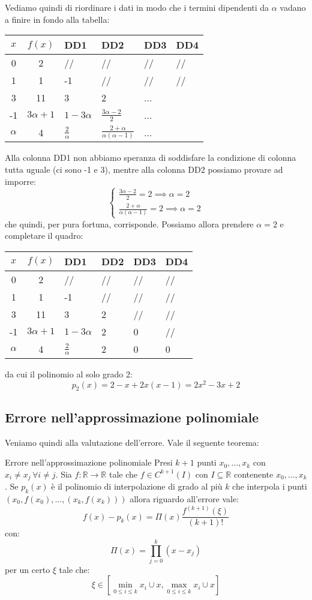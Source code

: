 \documentclass[a4paper,11pt]{article}
\begin{document}
Vediamo quindi di riordinare i dati in modo che i termini dipendenti da $\alpha$ vadano a finire in fondo alla tabella:
\begin{table}[H]
	\center 
	\begin{tabular} { c | c | p{1cm} p{1cm} p{1cm} p{1cm} }
		$x$ & $f(x)$ & DD1 & DD2 & DD3 & DD4\\
		\hline
		0 & 2 & // & // & // & // \\
		1 & 1 & -1 & // & // & // \\
		3 & 11 & 3 & 2 & ...\\
		-1 & $3 \alpha + 1$ & $1 - 3 \alpha$ & $\frac{3 \alpha - 2}{2}$ & ... \\
		$\alpha$ & 4 & $\frac{2}{\alpha}$ & $\frac{2 + \alpha}{\alpha(\alpha - 1)}$ & ...
	\end{tabular}
\end{table}

Alla colonna DD1 non abbiamo speranza di soddisfare la condizione di colonna tutta uguale (ci sono -1 e 3), mentre alla colonna DD2 possiamo provare ad imporre:
\[
	\begin{cases}
		\frac{3 \alpha - 2}{2} = 2 \implies \alpha = 2 \\
		\frac{2 + \alpha}{\alpha(\alpha - 1)} = 2 \implies \alpha = 2
	\end{cases}
\]
che quindi, per pura fortuna, corrisponde.
Possiamo allora prendere $\alpha = 2$ e completare il quadro:
\begin{table}[H]
	\center 
	\begin{tabular} { c | c | p{1cm} p{1cm} p{1cm} p{1cm} }
		$x$ & $f(x)$ & DD1 & DD2 & DD3 & DD4\\
		\hline
		0 & 2 & // & // & // & // \\
		1 & 1 & -1 & // & // & // \\
		3 & 11 & 3 & 2 & // & //\\
		-1 & $3 \alpha + 1$ & $1 - 3 \alpha$ & 2 & 0 & // \\
		$\alpha$ & 4 & $\frac{2}{\alpha}$ & 2 & 0 & 0
	\end{tabular}
\end{table}
da cui il polinomio al solo grado 2:
$$
p_2(x) = 2 - x + 2x(x - 1) = 2x^2 - 3x + 2
$$

\subsection{Errore nell'approssimazione polinomiale}
Veniamo quindi alla valutazione dell'errore.
Vale il seguente teorema:
\begin{theorem}{Errore nell'approssimazione polinomiale}
	Presi $k + 1$ punti $x_0, ..., x_k$ con $x_i \neq x_j \, \forall i \neq j$.
	Sia $f: \mathbb{R} \rightarrow \mathbb{R}$ tale che $f \in C^{k + 1}(I)$ con $I \subseteq \mathbb{R}$ contenente $x_0, ..., x_k$.
	Se $p_k(x)$ è il polinomio di interpolazione di grado al più $k$ che interpola i punti $(x_0, f(x_0), ..., (x_k, f(x_k)))$ allora riguardo all'errore vale:
$$
f(x) - p_k(x) = \Pi(x) \frac{f^{(k + 1)}(\xi)}{(k + 1)!}
$$
con:
$$
\Pi(x) = \prod_{j = 0}^k (x - x_j)
$$
per un certo $\xi$ tale che:
$$
\xi \in \left[ \min_{0 \leq i \leq k} x_i \cup x, \max_{0 \leq i \leq k} x_i \cup x \right]
$$
\end{theorem}
\end{document}
